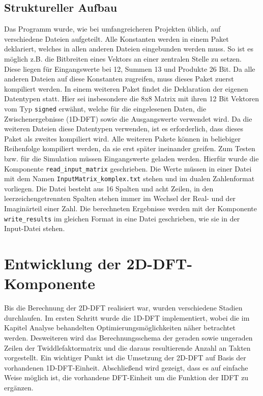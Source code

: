 \subsection{Struktureller Aufbau}
 Das Programm wurde, wie bei umfangreicheren Projekten üblich, auf verschiedene Dateien aufgeteilt. Alle Konstanten werden in einem Paket deklariert, welches in allen anderen Dateien
 eingebunden werden muss. So ist es möglich z.B. die Bitbreiten eines Vektors an einer zentralen Stelle zu setzen. Diese liegen für 
 Eingangswerte bei 12, Summen 13 und Produkte 26 Bit. Da alle anderen Dateien auf diese
 Konstanten zugreifen, muss dieses Paket zuerst kompiliert werden. In einem weiteren Paket findet die Deklaration der eigenen Datentypen statt. Hier sei
 insbesondere die 8x8 Matrix mit ihren 12 Bit Vektoren vom Typ \texttt{signed} erwähnt, welche für die eingelesenen 
 Daten, die Zwischenergebnisse (1D-DFT) sowie die Ausgangswerte verwendet wird.
 Da die weiteren Dateien diese Datentypen verwenden, ist es 
 erforderlich, dass dieses Paket als zweites kompiliert wird. Alle weiteren Pakete können in beliebiger Reihenfolge kompiliert werden, da sie erst später ineinander
 greifen. 
 Zum Testen bzw. für die Simulation müssen Eingangswerte geladen werden. Hierfür wurde die Komponente \texttt{read\_input\_matrix} geschrieben. Die Werte müssen
 in einer Datei mit dem Namen \texttt{InputMatrix\_komplex.txt} stehen und im dualen Zahlenformat vorliegen. 
 Die Datei besteht aus 16 Spalten und acht Zeilen, in den leerzeichengetrennten Spalten stehen immer im Wechsel der Real- und der Imaginärteil einer Zahl.
  Die berechneten Ergebnisse werden mit der Komponente \texttt{write\_results} im gleichen Format in eine Datei geschrieben, wie sie in der Input-Datei stehen. 



\section{Entwicklung der 2D-DFT-Komponente}
Bis die Berechnung der 2D-DFT realisiert war, wurden verschiedene Stadien durchlaufen. Im ersten Schritt wurde die 1D-DFT implementiert, wobei die im Kapitel
Analyse behandelten Optimierungsmöglichkeiten näher betrachtet werden. Desweiteren wird das Berechnungsschema der geraden sowie ungeraden Zeilen der 
Twiddlefaktormatrix und die daraus resultierende Anzahl an Takten vorgestellt.
Ein wichtiger Punkt ist die Umsetzung der 2D-DFT auf Basis der vorhandenen 1D-DFT-Einheit.
Abschließend wird gezeigt, dass es auf einfache Weise möglich ist, die vorhandene DFT-Einheit um die Funktion der IDFT zu ergänzen.




